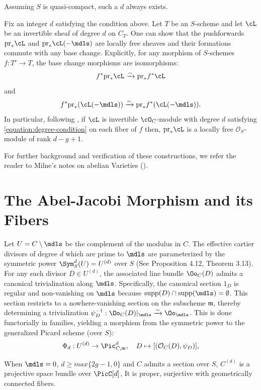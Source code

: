 Assuming $S$ is quasi-compact, such a $d$ always exists.

Fix an integer $d$ satisfying the condition above. Let $T$ be an $S$-scheme and let $\cL$ be an invertible sheaf of degree $d$ on $C_T$. One can show that the pushforwards $\mathrm{pr}_* \cL$ and $\mathrm{pr}_* \cL(-{\mdls})$ are locally free sheaves and their formations commute with any base change. Explicitly, for any morphism of $S$-schemes $f : T' \to T$, the base change morphisms are isomorphisms:
\[
    f^* \mathrm{pr}_* \cL \xrightarrow{\sim} \mathrm{pr}_* f^* \cL
\]
and
\[
    f^* \mathrm{pr}_* (\cL(-{\mdls})) \xrightarrow{\sim} \mathrm{pr}_* f^* (\cL(-{\mdls})).
\]
In particular, following \cite{Guignard2018}, if $\cL$ is invertible $\cO_C$-module with degree $d$ satisfying \ref{equation:degree-condition} on each fiber of $f$ then, $\mathrm{pr}_* \cL$ is a locally free $\mathcal{O}_S$-module of rank $d-g+1$.

For further background and verification of these constructions, we refer the reader to Milne's notes on abelian Varieties (\cite{milneAV}).

\section{The Abel-Jacobi Morphism and its Fibers}\label{section:AbelJacobi}


Let $U = C \setminus \mdls$ be the complement of the modulus in $C$.
The effective cartier divisors of degree $d$ which are prime to $\mdls$ are parameterized by the symmetric power $\Sym_S^d (U) = U^{(d)}$ over $S$ (See \cite{Guignard2018} Proposition 4.12, \cite{milneAV} Theorem 3.13).
For any such divisor $D \in U^{(d)}$, the associated line bundle $\Oo_C(D)$ admits a canonical trivialization along $\mdls$. 
Specifically, the canonical section $1_D$ is regular and non-vanishing on $\mdls$ because $\operatorname{supp}(D) \cap \operatorname{supp}(\mdls) = \emptyset$. 
This section restricts to a nowhere-vanishing section on the subscheme $\mathfrak{m}$, thereby determining a trivialization $\psi_D^{-1}: \Oo_C(D)|_{\mdls} \xrightarrow{\sim} \Oo_{\mdls}$.
This is done functorially in families, yielding a morphism from the symmetric power to the generalized Picard scheme (over $S$):
\begin{equation}
    \Phi_{d}: U^{(d)} \to \Pic^d_{C, \mathfrak{m}}, \quad D \mapsto [(\mathcal{O}_C(D), \psi_D)],
\end{equation}

When $\mdls = 0$, $d \geq max \{2g - 1, 0\}$ and $C$ admits a section over $S$, $C^{(d)}$ is a projective space bundle over $\PicC[d]$, 
It is proper, surjective with geometrically connected fibers.

